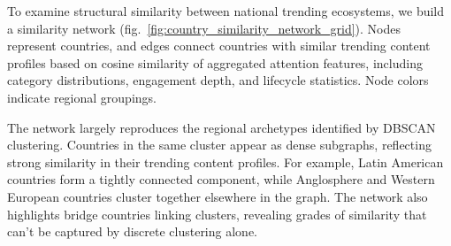 \documentclass[sigconf,11pt]{acmart}
\begin{document}
\begin{table}[ht]
\centering
\small
\caption{DBSCAN country archetypes ($\varepsilon=2.36$, \texttt{min\_samples=3}, 21-feature vectors).}
\label{tab:dbscan}
\end{table}

To examine structural similarity between national trending ecosystems, we build a similarity network (fig.~\ref{fig:country_similarity_network_grid}). Nodes represent countries, and edges connect countries with similar trending content profiles based on cosine similarity of aggregated attention features, including category distributions, engagement depth, and lifecycle statistics. Node colors indicate regional groupings.

The network largely reproduces the regional archetypes identified by DBSCAN clustering. Countries in the same cluster appear as dense subgraphs, reflecting strong similarity in their trending content profiles. For example, Latin American countries form a tightly connected component, while Anglosphere and Western European countries cluster together elsewhere in the graph. The network also highlights bridge countries linking clusters, revealing grades of similarity that can't be captured by discrete clustering alone.
\end{document}
